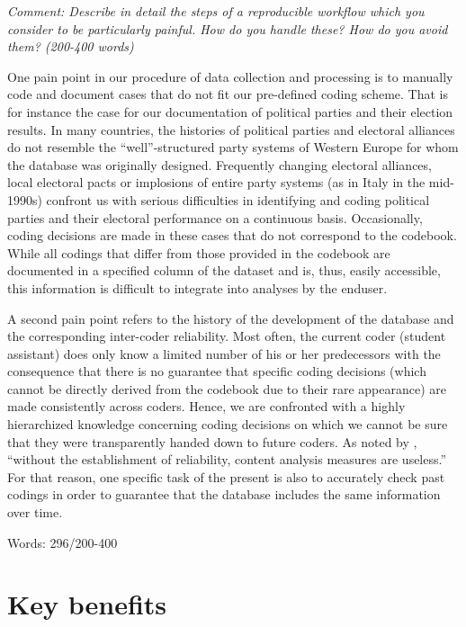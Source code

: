 \documentclass[
  11pt
]{article}
\begin{document}
\textit{Comment: Describe in detail the steps of a reproducible workflow which you consider to be particularly painful. How do you handle these? How do you avoid them? (200-400 words)}

\vspace*{1cm}

\noindent
One pain point in our procedure of data collection and processing is to manually code and document cases that do not fit our pre-defined coding scheme. That is for instance the case for our documentation of political parties and their election results. In many countries, the histories of political parties and electoral alliances do not resemble the ``well''-structured party systems of Western Europe for whom the database was originally designed. Frequently changing electoral alliances, local electoral pacts or implosions of entire party systems (as in Italy in the mid-1990s) confront us with serious difficulties in identifying and coding political parties and their electoral performance on a continuous basis. Occasionally, coding decisions are made in these cases that do not correspond to the codebook. While all codings that differ from those provided in the codebook are documented in a specified column of the dataset and is, thus, easily accessible, this information is difficult to integrate into analyses by the enduser.

A second pain point refers to the history of the development of the database and the corresponding inter-coder reliability. Most often, the current coder (student assistant) does only know a limited number of his or her predecessors with the consequence that there is no guarantee that specific coding decisions (which cannot be directly derived from the codebook due to their rare appearance) are made consistently across coders. Hence, we are confronted with a highly hierarchized knowledge concerning coding decisions on which we cannot be sure that they were transparently handed down to future coders. As noted by \citet[141]{krippendorf_content_2000}, ``without the establishment of reliability, content analysis measures are useless.'' For that reason, one specific task of the present is also to accurately check past codings in order to guarantee that the database includes the same information over time.

\vspace*{1cm}
\noindent
Words:  296/200-400

\section{Key benefits}
\end{document}
